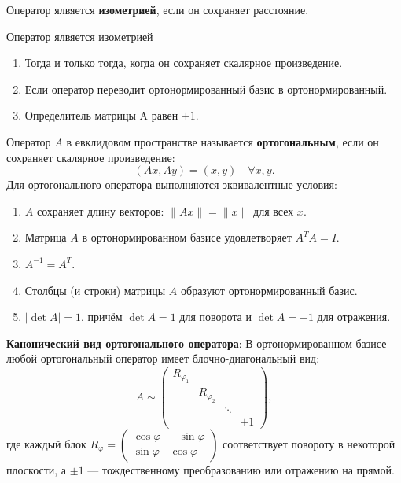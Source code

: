 \documentclass[12pt]{article}
\begin{document}
\begin{definitionbox}
    Оператор ялвяется \textbf{изометрией}, если он сохраняет расстояние.
\end{definitionbox}

\begin{remarkbox}
    Оператор ялвяется изометрией
    \begin{enumerate}
        \item Тогда и только тогда, когда он сохраняет скалярное произведение.
        \item Если оператор переводит ортонормированный базис в ортонормированный.
        \item Определитель матрицы A равен $\pm1$.
    \end{enumerate}
\end{remarkbox}

\begin{theorembox}
Оператор $A$ в евклидовом пространстве называется \textbf{ортогональным}, если он сохраняет скалярное произведение:
$$
(Ax, Ay) = (x, y) \quad \forall x, y.
$$
Для ортогонального оператора выполняются эквивалентные условия:
\begin{enumerate}
    \item $A$ сохраняет длину векторов: $\|Ax\| = \|x\|$ для всех $x$.
    \item Матрица $A$ в ортонормированном базисе удовлетворяет $A^T A = I$.
    \item $A^{-1} = A^T$.
    \item Столбцы (и строки) матрицы $A$ образуют ортонормированный базис.
    \item $|\det A| = 1$, причём $\det A = 1$ для поворота и $\det A = -1$ для отражения.
\end{enumerate}
\end{theorembox}

\begin{theorembox}
\textbf{Канонический вид ортогонального оператора}: В ортонормированном базисе любой ортогональный оператор имеет блочно-диагональный вид:
$$
A \sim
\begin{pmatrix}
R_{\varphi_1} & & & \\
& R_{\varphi_2} & & \\
& & \ddots & \\
& & & \pm 1
\end{pmatrix},
$$
где каждый блок $R_{\varphi} = \begin{pmatrix} \cos\varphi & -\sin\varphi \\ \sin\varphi & \cos\varphi \end{pmatrix}$ соответствует повороту в некоторой плоскости, а $\pm 1$ — тождественному преобразованию или отражению на прямой.
\end{theorembox}
\end{document}
